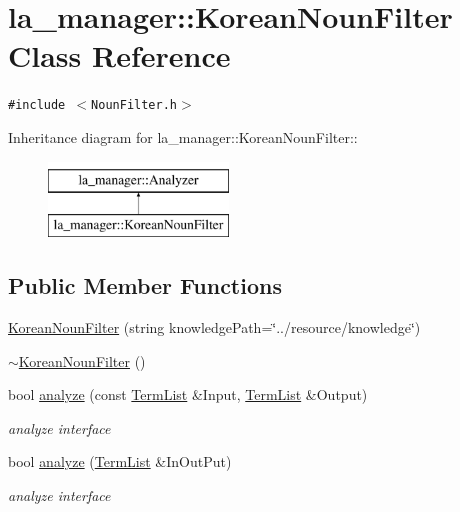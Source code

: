 \hypertarget{classla__manager_1_1KoreanNounFilter}{
\section{la\_\-manager::KoreanNounFilter Class Reference}
\label{classla__manager_1_1KoreanNounFilter}
}
{\tt \#include $<$NounFilter.h$>$}

Inheritance diagram for la\_\-manager::KoreanNounFilter::\begin{figure}[H]
\begin{center}
\leavevmode
\includegraphics[height=2cm]{classla__manager_1_1KoreanNounFilter}
\end{center}
\end{figure}
\subsection*{Public Member Functions}
\begin{CompactItemize}
\item 
\hyperlink{classla__manager_1_1KoreanNounFilter_1d9ef25ee72814af339c023f0c348764}{KoreanNounFilter} (string knowledgePath=\char`\"{}../resource/knowledge\char`\"{})
\item 
\hyperlink{classla__manager_1_1KoreanNounFilter_87509e16fd32308b618876c9bde46be6}{$\sim$KoreanNounFilter} ()
\item 
bool \hyperlink{classla__manager_1_1KoreanNounFilter_5722385ced3635d7d5f16cbc1db0f874}{analyze} (const \hyperlink{namespacela__manager_06c0aab93982ee3ebc3ef9d0419e619a}{TermList} \&Input, \hyperlink{namespacela__manager_06c0aab93982ee3ebc3ef9d0419e619a}{TermList} \&Output)
\begin{CompactList}\small\item\em analyze interface \item\end{CompactList}\item 
bool \hyperlink{classla__manager_1_1KoreanNounFilter_0ec4dcffc74feee2b7f72a2656c9c589}{analyze} (\hyperlink{namespacela__manager_06c0aab93982ee3ebc3ef9d0419e619a}{TermList} \&InOutPut)
\begin{CompactList}\small\item\em analyze interface \item\end{CompactList}\end{CompactItemize}
